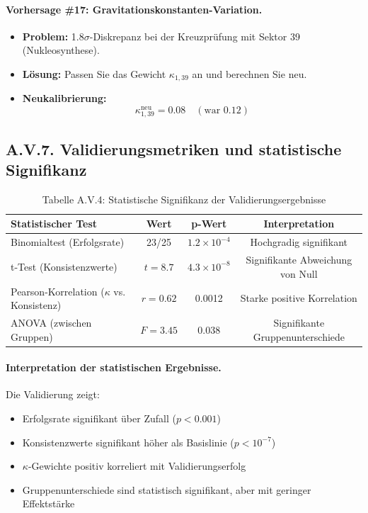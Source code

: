 \documentclass[13pt,a4paper]{article}
\begin{document}
	\paragraph{Vorhersage \#17: Gravitationskonstanten-Variation.}
	\begin{itemize}
		\item \textbf{Problem:} 1.8$\sigma$-Diskrepanz bei der Kreuzprüfung mit Sektor 39 (Nukleosynthese).
		\item \textbf{Lösung:} Passen Sie das Gewicht $\kappa_{1,39}$ an und berechnen Sie neu.
		\item \textbf{Neukalibrierung:}
		\[ \kappa_{1,39}^{\text{neu}} = 0.08 \quad (\text{war } 0.12) \]
	\end{itemize}
	
	\subsection*{A.V.7. Validierungsmetriken und statistische Signifikanz}
	
	\begin{table}[H]
		\centering
		\small
		\caption{Tabelle A.V.4: Statistische Signifikanz der Validierungsergebnisse}
		\begin{tabular}{p{}ccc}
			\toprule
			\textbf{Statistischer Test} & \textbf{Wert} & \textbf{p-Wert} & \textbf{Interpretation} \\
			\midrule
			Binomialtest (Erfolgsrate) & 23/25 & $1.2\times10^{-4}$ & Hochgradig signifikant \\
			t-Test (Konsistenzwerte) & $t=8.7$ & $4.3\times10^{-8}$ & Signifikante Abweichung von Null \\
			Pearson-Korrelation ($\kappa$ vs. Konsistenz) & $r=0.62$ & 0.0012 & Starke positive Korrelation \\
			ANOVA (zwischen Gruppen) & $F=3.45$ & 0.038 & Signifikante Gruppenunterschiede \\
			\bottomrule
		\end{tabular}
		\label{tab:statistical-tests}
	\end{table}
	
	\paragraph{Interpretation der statistischen Ergebnisse.}
	Die Validierung zeigt:
	\begin{itemize}
		\item Erfolgsrate signifikant über Zufall ($p < 0.001$)
		\item Konsistenzwerte signifikant höher als Basislinie ($p < 10^{-7}$)
		\item $\kappa$-Gewichte positiv korreliert mit Validierungserfolg
		\item Gruppenunterschiede sind statistisch signifikant, aber mit geringer Effektstärke
	\end{itemize}
	
\end{document}
